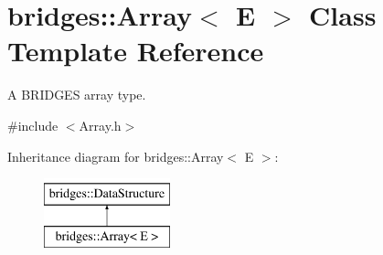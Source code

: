 \hypertarget{classbridges_1_1_array}{}\section{bridges\+:\+:Array$<$ E $>$ Class Template Reference}
\label{classbridges_1_1_array}


A B\+R\+I\+D\+G\+E\+S array type.  




{\ttfamily \#include $<$Array.\+h$>$}

Inheritance diagram for bridges\+:\+:Array$<$ E $>$\+:\begin{figure}[H]
\begin{center}
\leavevmode
\includegraphics[height=2.000000cm]{classbridges_1_1_array}
\end{center}
\end{figure}
